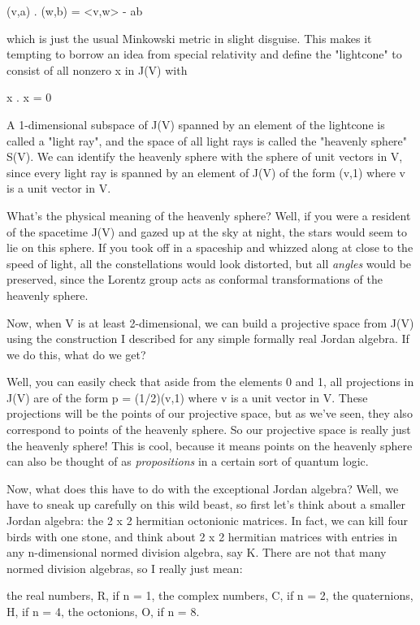 (v,a) . (w,b) = <v,w> - ab

which is just the usual Minkowski metric in slight disguise.  This
makes it tempting to borrow an idea from special relativity and
define the "lightcone" to consist of all nonzero x in J(V) with

x . x = 0

A 1-dimensional subspace of J(V) spanned by an element of the lightcone
is called a "light ray", and the space of all light rays is
called the "heavenly sphere" S(V).  We can identify the
heavenly sphere with the sphere of unit vectors in V, since every light
ray is spanned by an element of J(V) of the form (v,1) where v is a unit
vector in V.

What's the physical meaning of the heavenly sphere?  Well, if you were
a resident of the spacetime J(V) and gazed up at the sky at night, the
stars would seem to lie on this sphere.  If you took off in a spaceship
and whizzed along at close to the speed of light, all the constellations
would look distorted, but all \emph{angles} would be preserved, since the
Lorentz group acts as conformal transformations of the heavenly sphere. 

Now, when V is at least 2-dimensional, we can build a projective space
from J(V) using the construction I described for any simple formally 
real Jordan algebra.  If we do this, what do we get?  

Well, you can easily check that aside from the elements 0 and 1, all
projections in J(V) are of the form p = (1/2)(v,1) where v is a unit
vector in V.  These projections will be the points of our projective
space, but as we've seen, they also correspond to points of the heavenly
sphere.   So our projective space is really just the heavenly sphere!
This is cool, because it means points on the heavenly sphere can also
be thought of as \emph{propositions} in a certain sort of quantum logic.

Now, what does this have to do with the exceptional Jordan algebra? 
Well, we have to sneak up carefully on this wild beast, so first let's 
think about a smaller Jordan algebra: the 2 x 2 hermitian octonionic 
matrices.  In fact, we can kill four birds with one stone, and think 
about 2 x 2 hermitian matrices with entries in any n-dimensional 
normed division algebra, say K.  There are not that many normed 
division algebras, so I really just mean:

the real numbers,    R, if n = 1, 
the complex numbers, C, if n = 2,
the quaternions,     H, if n = 4, 
the octonions,       O, if n = 8.  

